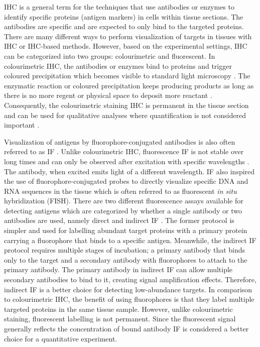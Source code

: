 IHC is a general term for the techniques that use antibodies or enzymes to identify specific proteins (antigen markers) in cells within tissue sections. The antibodies are specific and are expected to only bind to the targeted proteins. There are many different ways to perform visualization of targets in tissues with IHC or IHC-based methods. However, based on the experimental settings, IHC can be categorized into two groups: colourimetric and fluorescent. In colourimetric IHC, the antibodies or enzymes bind to proteins and trigger coloured precipitation which becomes visible to standard light microscopy \cite{BOURGEOIS2014132}. The enzymatic reaction or coloured precipitation keeps producing products as long as there is no more regent or physical space to deposit more reactant \cite{corthell2014basic}. Consequently, the colourimetric staining IHC is permanent in the tissue section and can be used for qualitative analyses where quantification is not considered important \cite{seidal2001interpretation}. 

Visualization of antigens by fluorophore-conjugated antibodies is also often referred to as IF \cite{joshi2017immunofluorescence}. Unlike colourimetric IHC, fluorescence IF is not stable over long times and can only be observed after excitation with specific wavelengths \cite{corthell2014basic}. The antibody, when excited emits light of a different wavelength. IF also inspired the use of fluorophore-conjugated probes to directly visualize specific DNA and RNA sequences in the tissue which is often referred to as fluorescent \textit{in situ} hybridization (FISH). There are two different fluorescence assays available for detecting antigens which are categorized by whether a single antibody or two antibodies are used, namely direct and indirect IF \cite{JOSHI2017135}. The former protocol is simpler and used for labelling abundant target proteins with a primary protein carrying a fluorophore that binds to a specific antigen. Meanwhile, the indirect IF protocol requires multiple stages of incubation; a primary antibody that binds only to the target and a secondary antibody with fluorophores to attach to the primary antibody. The primary antibody in indirect IF can allow multiple secondary antibodies to bind to it, creating signal amplification effects. Therefore, indirect IF is a better choice for detecting low-abundance targets. In comparison to colourimetric IHC, the benefit of using fluorophores is that they label multiple targeted proteins in the same tissue sample. However, unlike colourimetric staining, fluorescent labelling is not permanent. Since the fluorescent signal generally reflects the concentration of bound antibody \cite{dabbs2017diagnostic} IF is considered a better choice for a quantitative experiment.

